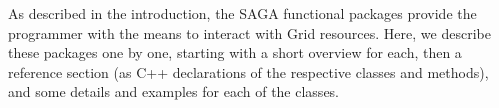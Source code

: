
 As described in the introduction, the SAGA functional packages  provide the programmer with the means
 to interact with Grid resources.  Here, we describe these packages one
 by one, starting with a short overview for each, then a reference
 section (as C++ declarations of the respective classes and methods),
 and some details and examples for each of the classes.

